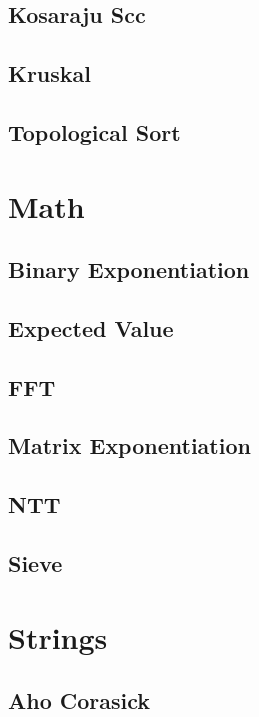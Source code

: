 \documentclass[a4paper,10pt]{article}
\begin{document}
\subsection{Kosaraju Scc}

\subsection{Kruskal}

\subsection{Topological Sort}

\section{Math}
\subsection{Binary Exponentiation}

\subsection{Expected Value}

\subsection{FFT}

\subsection{Matrix Exponentiation}

\subsection{NTT}

\subsection{Sieve}

\section{Strings}
\subsection{Aho Corasick}

\end{document}
